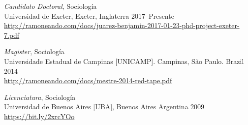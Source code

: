 {\sl Candidato Doctoral}, Sociología \\
Universidad de Exeter, Exeter, Inglaterra \hfill 2017--Presente  \\
\url{http://ramoneando.com/docs/juarez-benjamin-2017-01-23-phd-project-exeter-7.pdf}

{\sl Magister}, Sociología \\ 
Universidade Estadual de Campinas [UNICAMP]. Campinas, São Paulo. Brazil \hfill 2014\\
\url{http://ramoneando.com/docs/mestre-2014-red-tape.pdf}

{\sl Licenciatura}, Sociología \\ 
Universidad de Buenos Aires [UBA], Buenos Aires Argentina \hfill 2009 \\
\url{https://bit.ly/2xrcYOo}


% 

  

  
